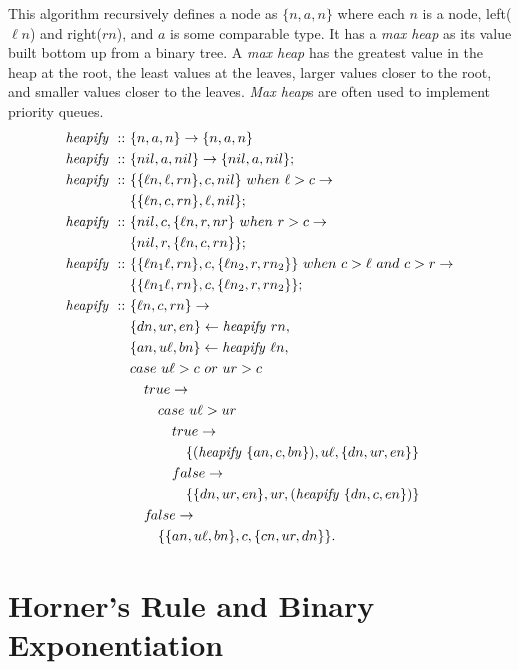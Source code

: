 \documentclass[a4paper,10pt]{book}
\newcommand\when{\  when\ }
\newcommand{\false}{f\kern-0.25ex{alse}}
\begin{document}
This algorithm recursively defines a node as $\{n,a,n\}$ where each $n$ is a node, left($\ell{n}$) and right($rn$), and $a$ is some comparable type. It has a \textit{max heap} as its value built bottom up from a binary tree. A \textit{max heap} has the greatest value in the heap at the root, the least values at the leaves, larger values closer to the root, and smaller values closer to the leaves. \textit{Max heap}s are often used to implement priority queues.
\begin{align*}
\text{\textit{heapify}}\ ::\ &\{n,a,n\}\rightarrow\{n,a,n\}\\
\text{\textit{heapify}}\ ::\ &\{nil,a,nil\}\rightarrow \{nil,a,nil\};\\
\text{\textit{heapify}}\ ::\ &\{\{\ell{n},\ell,rn\},c,nil\}\when\ell>c\rightarrow\\
	&\{\{\ell{n},c,rn\},\ell,nil\};\\
\text{\textit{heapify}}\ ::\ &\{nil,c,\{\ell{n},r,nr\}\when r>c\rightarrow\\
	&\{nil,r,\{\ell{n},c,rn\}\};\\
\text{\textit{heapify}}\ ::\ &\{\{\ell{n}_1\ell,rn\},c,\{\ell{n}_2,r,rn_2\}\}\when c>\ell\ and\ c>r\rightarrow\\
	&\{\{\ell{n}_1\ell,rn\},c,\{\ell{n}_2,r,rn_2\}\};\\
\text{\textit{heapify}}\ ::\ &\{\ell{n},c,rn\}\rightarrow\\
	&\{dn,ur,en\}\leftarrow \text{\textit{heapify}}\ rn,\\
	&\{an,u\ell,bn\}\leftarrow \text{\textit{heapify}}\ \ell{n},\\
	&case\ u\ell > c\ or\ ur > c\\
	&\quad true\rightarrow\\
	&\qquad case\ u\ell > ur\\
	&\qquad\quad true\rightarrow\\
	&\qquad\qquad \{(\text{\textit{heapify}}\ \{an,c,bn\}),u\ell,\{dn,ur,en\}\}\\
	&\qquad\quad false\rightarrow\\
	&\qquad\qquad \{\{dn,ur,en\},ur,(\text{\textit{heapify}}\ \{dn,c,en\})\}\\
	&\quad\false\rightarrow\\
	&\qquad \{\{an,u\ell,bn\},c,\{cn,ur,dn\}\}.
\end{align*}
\section{Horner's Rule and Binary Exponentiation}
\end{document}
